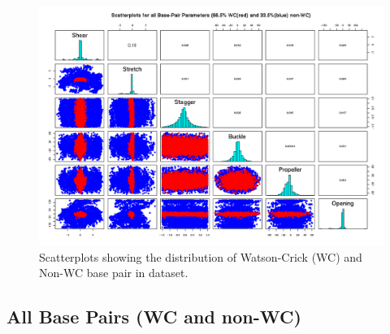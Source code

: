 \begin{figure}[H]
\centering
\includegraphics[scale=0.6, angle=90]{allscatter.png}
\caption{Scatterplots showing the distribution of Watson-Crick (WC)
  and Non-WC base pair in dataset.}
\label{fig:WCandnon}
\end{figure}


\subsection{All Base Pairs (WC and non-WC)}

